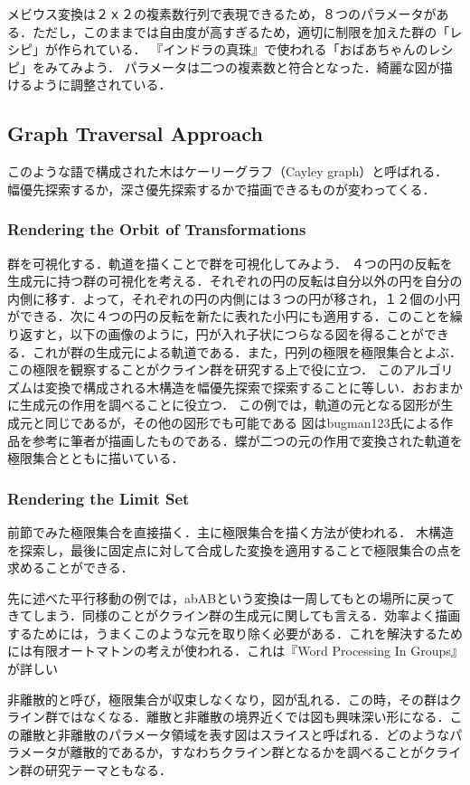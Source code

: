 メビウス変換は２ｘ２の複素数行列で表現できるため，８つのパラメータがある．ただし，このままでは自由度が高すぎるため，適切に制限を加えた群の「レシピ」が作られている．
『インドラの真珠』で使われる「おばあちゃんのレシピ」をみてみよう．
パラメータは二つの複素数と符合となった．綺麗な図が描けるように調整されている．

\subsection{Graph Traversal Approach}
このような語で構成された木はケーリーグラフ（Cayley graph）と呼ばれる．
幅優先探索するか，深さ優先探索するかで描画できるものが変わってくる．

\subsubsection{Rendering the Orbit of Transformations}
群を可視化する．軌道を描くことで群を可視化してみよう．
４つの円の反転を生成元に持つ群の可視化を考える．それぞれの円の反転は自分以外の円を自分の内側に移す．よって，それぞれの円の内側には３つの円が移され，１２個の小円ができる．次に４つの円の反転を新たに表れた小円にも適用する．このことを繰り返すと，以下の画像のように，円が入れ子状につらなる図を得ることができる．これが群の生成元による軌道である．また，円列の極限を極限集合とよぶ．この極限を観察することがクライン群を研究する上で役に立つ．
このアルゴリズムは変換で構成される木構造を幅優先探索で探索することに等しい．おおまかに生成元の作用を調べることに役立つ．
この例では，軌道の元となる図形が生成元と同じであるが，その他の図形でも可能である
図はbugman123氏による作品を参考に筆者が描画したものである．蝶が二つの元の作用で変換された軌道を極限集合とともに描いている．

\subsubsection{Rendering the Limit Set}
前節でみた極限集合を直接描く．主に極限集合を描く方法が使われる．
木構造を探索し，最後に固定点に対して合成した変換を適用することで極限集合の点を求めることができる．

先に述べた平行移動の例では，abABという変換は一周してもとの場所に戻ってきてしまう．同様のことがクライン群の生成元に関しても言える．効率よく描画するためには，うまくこのような元を取り除く必要がある．これを解決するためには有限オートマトンの考えが使われる．これは『Word Processing In Groups』が詳しい

非離散的と呼び，極限集合が収束しなくなり，図が乱れる．この時，その群はクライン群ではなくなる．離散と非離散の境界近くでは図も興味深い形になる．この離散と非離散のパラメータ領域を表す図はスライスと呼ばれる．どのようなパラメータが離散的であるか，すなわちクライン群となるかを調べることがクライン群の研究テーマともなる．

